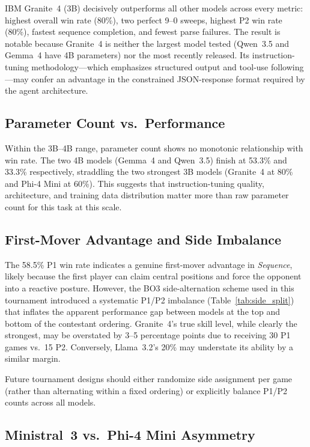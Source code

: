 \documentclass[11pt]{article}
\begin{document}
IBM Granite~4 (3B) decisively outperforms all other models across every metric: highest overall win rate (80\%), two perfect 9--0 sweeps, highest P2 win rate (80\%), fastest sequence completion, and fewest parse failures. The result is notable because Granite~4 is neither the largest model tested (Qwen~3.5 and Gemma~4 have 4B parameters) nor the most recently released. Its instruction-tuning methodology---which emphasizes structured output and tool-use following---may confer an advantage in the constrained JSON-response format required by the agent architecture.

\subsection{Parameter Count vs.\ Performance}

Within the 3B--4B range, parameter count shows no monotonic relationship with win rate. The two 4B models (Gemma~4 and Qwen~3.5) finish at 53.3\% and 33.3\% respectively, straddling the two strongest 3B models (Granite~4 at 80\% and Phi-4 Mini at 60\%). This suggests that instruction-tuning quality, architecture, and training data distribution matter more than raw parameter count for this task at this scale.

\subsection{First-Mover Advantage and Side Imbalance}

The 58.5\% P1 win rate indicates a genuine first-mover advantage in \textit{Sequence}, likely because the first player can claim central positions and force the opponent into a reactive posture. However, the BO3 side-alternation scheme used in this tournament introduced a systematic P1/P2 imbalance (Table~\ref{tab:side_split}) that inflates the apparent performance gap between models at the top and bottom of the contestant ordering. Granite~4's true skill level, while clearly the strongest, may be overstated by 3--5 percentage points due to receiving 30 P1 games vs.\ 15 P2. Conversely, Llama~3.2's 20\% may understate its ability by a similar margin.

Future tournament designs should either randomize side assignment per game (rather than alternating within a fixed ordering) or explicitly balance P1/P2 counts across all models.

\subsection{Ministral~3 vs.\ Phi-4 Mini Asymmetry}
\end{document}
